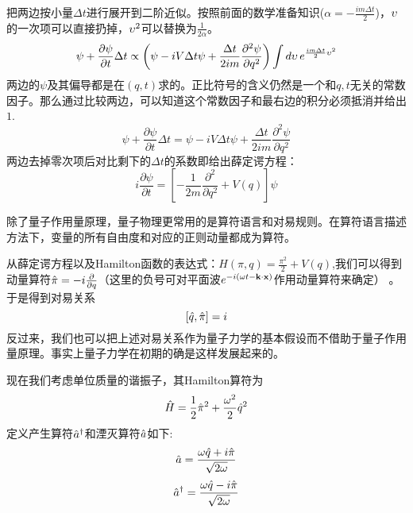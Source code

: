 \documentclass[CJK]{beamer}
\begin{document}
\begin{frame}
\bch
把两边按小量$\Delta t$进行展开到二阶近似。按照前面的数学准备知识($\alpha = -\frac{im\Delta t}{2}$)，$\upsilon$的一次项可以直接扔掉，$\upsilon^2$可以替换为$\frac{1}{2\alpha}$。
$$ \psi + \frac{\partial \psi}{\partial t}\Delta t \propto \left(\psi - iV\Delta t \psi + \frac{\Delta t}{2i m}\frac{\partial^2\psi}{\partial q^2}\right) \int d\upsilon\, e^{\frac{im\Delta t}{2} \upsilon^2}$$
两边的$\psi$及其偏导都是在$(q, t)$求的。正比符号的含义仍然是一个和$q,t$无关的常数因子。那么通过比较两边，可以知道这个常数因子和最右边的积分必须抵消并给出$1$.
$$ \psi + \frac{\partial \psi}{\partial t}\Delta t  = \psi - iV\Delta t \psi + \frac{\Delta t}{2i m}\frac{\partial^2\psi}{\partial q^2}$$
两边去掉零次项后对比剩下的$\Delta t$的系数即给出薛定谔方程：
$$ i\frac{\partial \psi}{\partial t} = \left[-\frac{1}{2m}\frac{\partial^2}{\partial q^2} + V(q)\right] \psi$$
\ech
\end{frame}

\begin{frame}
\bch
除了量子作用量原理，量子物理更常用的是算符语言和对易规则。在算符语言描述方法下，变量的所有自由度和对应的正则动量都成为算符。

\skipline
从薛定谔方程以及Hamilton函数的表达式：$H(\pi, q) = \frac{\pi^2}{2} + V(q)$,我们可以得到动量算符$\hat{\pi} = -i\frac{\partial}{\partial q}$（这里的负号可对平面波$e^{-i(\omega t -\mathbf{k}\cdot\mathbf{x})}$作用动量算符来确定） 。于是得到对易关系
$$[\hat{q}, \hat{\pi}] = i$$
反过来，我们也可以把上述对易关系作为量子力学的基本假设而不借助于量子作用量原理。事实上量子力学在初期的确是这样发展起来的。
\ech
\end{frame}


\begin{frame}
\bch
现在我们考虑单位质量的谐振子，其Hamilton算符为
$$\hat{H} = \frac{1}{2}\hat{\pi}^2 + \frac{\omega^2}{2}\hat{q}^2$$
定义产生算符${\hat{a}^\dagger}$和湮灭算符$\hat{a}$如下:
$$\hat{a} = \frac{\omega\hat{q} + i\hat{\pi}}{\sqrt{2\omega}}$$
$${\hat{a}^\dagger} = \frac{\omega\hat{q} - i\hat{\pi}}{\sqrt{2\omega}}$$

\ech
\end{frame}
\end{document}
